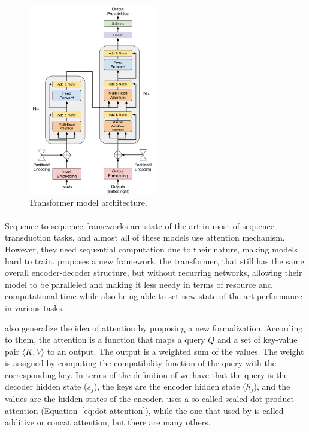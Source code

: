 \begin{figure}[h]
        \centering
        \includegraphics[width=0.5\textwidth]{images/Transformer.pdf}
        \caption{Transformer model architecture.}
        \label{fig:transformer}
\end{figure}

\paragraph{}
Sequence-to-sequence frameworks are state-of-the-art in most of sequence transduction tasks, and almost all of these models use attention mechanism. However, they need sequential computation due to their nature, making models hard to train. \citet{vaswani2017attention} proposes a new framework, the transformer, that still has the same overall encoder-decoder structure, but without recurring networks, allowing their model to be paralleled and making it less needy in terms of resource and computational time while also being able to set new state-of-the-art performance in various tasks.

\citet{vaswani2017attention} also generalize the idea of attention by proposing a new formalization. According to them, the attention is a function that maps a query $Q$ and a set of key-value pair $\langle K, V\rangle$ to an output. The output is a weighted sum of the values. The weight is assigned by computing the compatibility function of the query with the corresponding key. In terms of the definition of \citet{bahdanau2014neural} we have that the query is the decoder hidden state ($s_j$), the keys are the encoder hidden state ($h_j$), and the values are the hidden states of the encoder. \citet{vaswani2017attention} uses a so called scaled-dot product attention (Equation~\ref{eq:dot-attention}), while the one that used by \cite{bahdanau2014neural} is called additive or concat attention, but there are many others.

